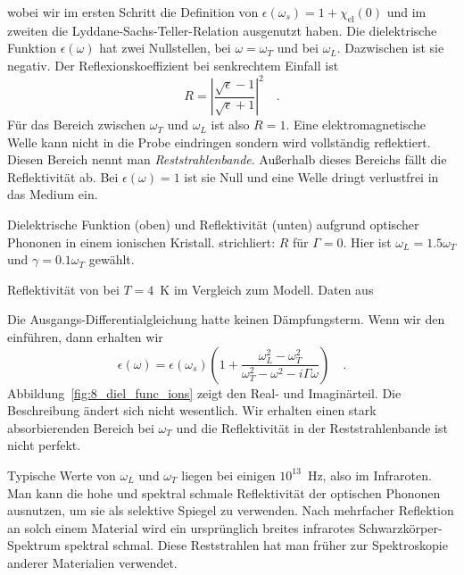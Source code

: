wobei wir im ersten Schritt die Definition von $\epsilon(\omega_s) = 1 + \chi_\text{el}(0)$ und im zweiten die Lyddane-Sachs-Teller-Relation ausgenutzt haben. Die dielektrische Funktion  $\epsilon(\omega)$ hat zwei Nullstellen, bei  $\omega = \omega_T$ und bei $\omega_L$. Dazwischen ist sie negativ. Der Reflexionskoeffizient bei senkrechtem Einfall ist
\begin{equation}
    R = \left| \frac{\sqrt{\epsilon} - 1 }{\sqrt{\epsilon} + 1} \right|^2 \quad .
\end{equation}
Für das Bereich zwischen $\omega_T$ und $\omega_L$ ist also $R=1$. Eine elektromagnetische Welle kann nicht in die Probe eindringen sondern wird vollständig reflektiert. Diesen Bereich nennt man \emph{Reststrahlenbande}. Außerhalb dieses Bereichs fällt die Reflektivität ab. Bei $\epsilon(\omega) = 1$ ist sie Null und eine Welle dringt verlustfrei in das Medium ein.

\begin{marginfigure}[-80mm]
    \caption{Dielektrische Funktion (oben) und Reflektivität (unten) aufgrund optischer Phononen in einem ionischen Kristall. strichliert: $R$ für $\Gamma =0$. Hier ist $\omega_L = 1.5 \omega_T$ und $\gamma = 0.1 \omega_T$ gewählt.
    \label{fig:8_diel_func_ions} }
\end{marginfigure}

\begin{marginfigure}
    \caption{Reflektivität von  bei $T=4$~K im Vergleich zum Modell. Daten aus \cite{yu_cardona}
    \label{fig:8_inas_refl} }
\end{marginfigure}
    

Die Ausgangs-Differentialgleichung hatte keinen Dämpfungsterm. Wenn wir den einführen, dann erhalten wir 
\begin{equation}
    \epsilon(\omega) = \epsilon(\omega_s)  \left(
1 + 
\frac{ \omega_L^2 -  \omega_T^2}{\omega_T^2 - \omega^2 - i \Gamma \omega}
    \right)  \quad . \label{eq:8_eps_ion_gamma}
\end{equation}
Abbildung~\ref{fig:8_diel_func_ions}  zeigt den Real- und Imaginärteil.
Die Beschreibung ändert sich nicht wesentlich. Wir erhalten einen stark absorbierenden Bereich bei $\omega_T$ und die Reflektivität in der Reststrahlenbande ist nicht perfekt. 


Typische Werte von $\omega_L$ und $\omega_T$ liegen bei einigen $10^{13}$~Hz, also im Infraroten. Man kann die hohe und spektral schmale Reflektivität der optischen Phononen ausnutzen, um sie als selektive Spiegel zu verwenden. Nach mehrfacher Reflektion an solch einem Material wird ein ursprünglich breites infrarotes Schwarzkörper-Spektrum spektral schmal. Diese Reststrahlen hat man früher zur Spektroskopie anderer Materialien verwendet.




